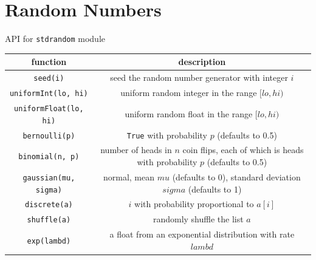\documentclass[8pt,a4paper,compress]{beamer}
\begin{document}
\section{Random Numbers}
\begin{frame}[fragile]
\pause

API for \lstinline{stdrandom} module
\begin{center}
\begin{tabular}{cc}
function & description \\ \hline
\lstinline$seed(i)$ & seed the random number generator with integer $i$ \\
\lstinline$uniformInt(lo, hi)$ & uniform random integer in the range $[lo, hi)$ \\
\lstinline$uniformFloat(lo, hi)$ & uniform random float in the range $[lo, hi)$ \\
\lstinline$bernoulli(p)$ & \lstinline$True$ with probability $p$ (defaults to 0.5) \\
\lstinline$binomial(n, p)$ & \makecell{number of heads in $n$ coin flips, each of which is \\ heads with probability $p$ (defaults to 0.5)} \\
\lstinline$gaussian(mu, sigma)$ &  \makecell{normal, mean $mu$ (defaults to 0), \\ standard deviation $sigma$ (defaults to 1)} \\
\lstinline$discrete(a)$ & $i$ with probability proportional to $a[i]$ \\
\lstinline$shuffle(a)$ & randomly shuffle the list $a$ \\
\lstinline$exp(lambd)$ & a float from an exponential distribution with rate $lambd$ 
\end{tabular} 
\end{center}
\end{frame}
\end{document}
